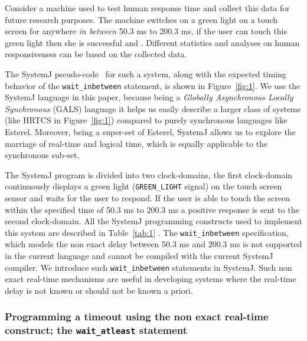 Consider a machine used to test human response time and collect this
data for future research purposes. The machine switches on a green light
on a touch screen for anywhere \textit{in between} 50.3 ms to 200.3 ms,
if the user can touch this green light then she is successful and . Different statistics and analyses on human
responsiveness can be based on the collected data.

The SystemJ pseudo-code~\cite{amal10} for such a system, along with the
expected timing behavior of the \texttt{wait\_inbetween} statement, is
shown in Figure~\ref{fig:1}. We use the SystemJ language in this paper, 
because being a \textit{Globally Asynchronous Locally
  Synchronous} (GALS) language it helps us easily describe a larger
class of systems (like HRTCS in Figure~\ref{fig:1}) compared to purely
synchronous languages like Esterel. Moreover, being a super-set of
Esterel, SystemJ allows us to explore the marriage of real-time and
logical time, which is equally applicable to the synchronous sub-set.

The SystemJ program is divided into two 
clock-domains, the first clock-domain continuously displays a green
light (\texttt{GREEN\_LIGHT} signal) on the touch screen sensor and
waits for the user to respond. If the user is able to touch the screen
within the specified time of 50.3 ms to 200.3 ms a positive response is
sent to the second clock-domain. All the SystemJ programming constructs
used to implement this system are described in Table~\ref{tab:1} . The
\texttt{wait\_inbetween} specification, which models the non exact
delay between 50.3 ms and 200.3 ms is not supported in the current
language and cannot be compiled with the current SystemJ compiler. We
introduce such \texttt{wait\_inbetween} statements in SystemJ. Such
non exact real-time mechanisms are useful in developing systems where
the real-time delay is not known or should not be known a priori.

\subsubsection{Programming a timeout using the non exact real-time
  construct; the \texttt{wait\_atleast} statement}
\label{sec:progr-time-using}

